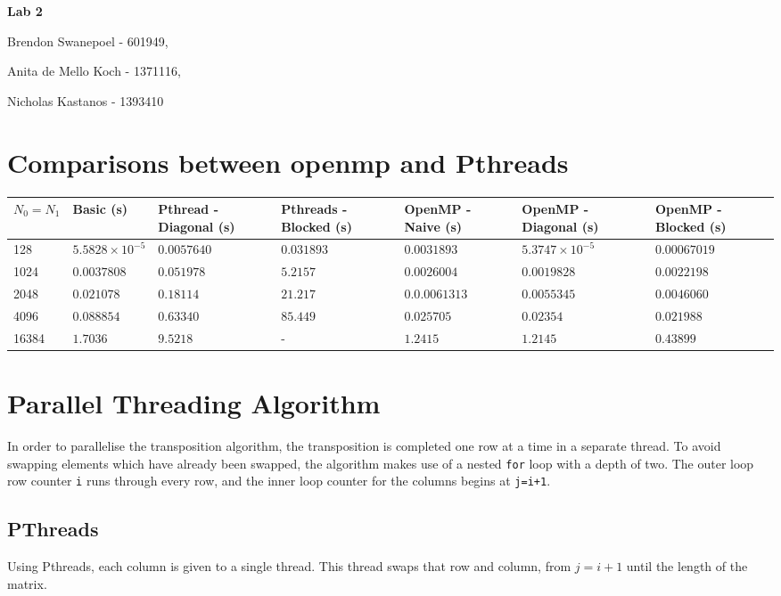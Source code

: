 \documentclass[a4paper,10pt]{article}
\begin{document}
{\LARGE{\centerline{\bf Lab 2}}}
{\Large{\centerline{Brendon Swanepoel - 601949,}
\centerline{ Anita de Mello Koch - 1371116,} 
\centerline{Nicholas Kastanos - 1393410}}}

\section{Comparisons between openmp and Pthreads}

\begin{center}
\begin{tabular}{| p{2cm} | p{2cm} | p{2cm} | p{2cm} | p{2cm} | p{2cm} | p{2cm} |}
\hline
 $N_{0}=N_{1}$  & Basic (s) & Pthread -  Diagonal (s)& Pthreads - Blocked (s)&OpenMP - Naive (s)& OpenMP - Diagonal (s)& OpenMP - Blocked (s)\\ \hline
 128 & $5.5828\times10^{-5}$ & $0.0057640$ &$0.031893$&$0.0031893$&$5.3747\times 10^{-5}$&$0.00067019$\\  
 1024 & $0.0037808$ & $0.051978$ &$5.2157$&$0.0026004$&$0.0019828$&$0.0022198$\\
 2048& $0.021078$ & $0.18114$ &$21.217$&$0.0.0061313$&$0.0055345$&$0.0046060$\\
 4096 & $0.088854$ & $0.63340$ &$85.449$&$0.025705$&$0.02354$&$0.021988$\\
 16384 & $1.7036$ & $9.5218$ &-&$1.2415$&$1.2145$&$0.43899$\\
 \hline    
\end{tabular}
\end{center}

\section{Parallel Threading Algorithm}
In order to parallelise the transposition algorithm, the transposition is completed one row at a time in a separate thread. To avoid swapping elements which have already been swapped, the algorithm makes use of a nested \verb|for| loop with a depth of two. The outer loop row counter \verb|i| runs through every row, and the inner loop counter for the columns begins at \verb|j=i+1|. 

\subsection{PThreads}

Using Pthreads, each column is given to a single thread.
This thread swaps that row and column, from $j=i+1$ until the length of the matrix.
\end{document}
